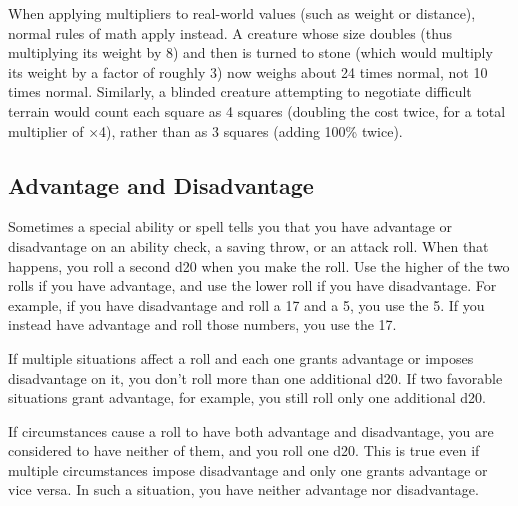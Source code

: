 When applying multipliers to real-world values (such as weight or distance), normal rules of math apply instead. A creature whose size doubles (thus multiplying its weight by 8) and then is turned to stone (which would multiply its weight by a factor of roughly 3) now weighs about 24 times normal, not 10 times normal. Similarly, a blinded creature attempting to negotiate difficult terrain would count each square as 4 squares (doubling the cost twice, for a total multiplier of $\times$4), rather than as 3 squares (adding 100\% twice).

\subsection{Advantage and Disadvantage}
Sometimes a special ability or spell tells you that you have advantage or disadvantage on an ability check, a saving throw, or an attack roll. When that happens, you roll a second d20 when you make the roll. Use the higher of the two rolls if you have advantage, and use the lower roll if you have disadvantage. For example, if you have disadvantage and roll a 17 and a 5, you use the 5. If you instead have advantage and roll those numbers, you use the 17.

If multiple situations affect a roll and each one grants advantage or imposes disadvantage on it, you don't roll more than one additional d20. If two favorable situations grant advantage, for example, you still roll only one additional d20.

If circumstances cause a roll to have both advantage and disadvantage, you are considered to have neither of them, and you roll one d20. This is true even if multiple circumstances impose disadvantage and only one grants advantage or vice versa. In such a situation, you have neither advantage nor disadvantage.
